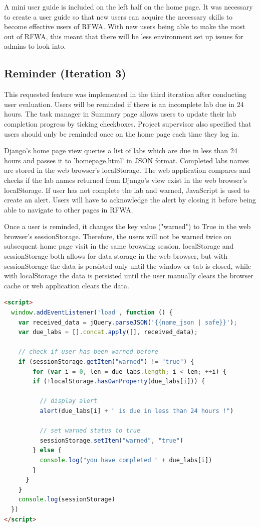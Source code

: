 \documentclass{l4proj}
\begin{document}
A mini user guide is included on the left half on the home page. It was necessary to create a user guide so that new users can acquire the necessary skills to become effective users of RFWA. With new users being able to make the most out of RFWA, this meant that there will be less environment set up issues for admins to look into. 

\subsection{Reminder (Iteration 3)}

This requested feature was implemented in the third iteration after conducting user evaluation. Users will be reminded if there is an incomplete lab due in 24 hours. The task manager in Summary page allows users to update their lab completion progress by ticking checkboxes. Project supervisor also specified that users should only be reminded once on the home page each time they log in.  

Django's home page view queries a list of labs which are due in less than 24 hours and passes it to 'homepage.html' in JSON format. Completed labs names are stored in the web browser's localStorage. The web application compares and checks if the lab names returned from Django's view exist in the web browser's localStorage. If user has not complete the lab and warned, JavaScript is used to create an alert. Users will have to acknowledge the alert by closing it before being able to navigate to other pages in RFWA. 

Once a user is reminded, it changes the key value ("warned") to True in the web browser's sessionStorage. Therefore, the users will not be warned twice on subsequent home page visit in the same browsing session. localStorage and sessionStorage both allows for data storage in the web browser, but with sessionStorage the data is persisted only until the window or tab is closed, while with localStorage the data is persisted until the user manually clears the browser cache or web application clears the data.

\begin{lstlisting}[language=HTML, caption={JavaScript code implementation of the incomplete lab reminder feature}, label=lst:reminder]
<script>
  window.addEventListener('load', function () {
    var received_data = jQuery.parseJSON('{{name_json | safe}}');
    var due_labs = [].concat.apply([], received_data);

    // check if user has been warned before
    if (sessionStorage.getItem("warned") != "true") {
        for (var i = 0, len = due_labs.length; i < len; ++i) {
        if (!localStorage.hasOwnProperty(due_labs[i])) {
        
          // display alert
          alert(due_labs[i] + " is due in less than 24 hours !")
          
          // set warned status to true
          sessionStorage.setItem("warned", "true")
        } else {
          console.log("you have completed " + due_labs[i])
        }
      }
    }
    console.log(sessionStorage)
  })
</script>
\end{lstlisting}
\end{document}
